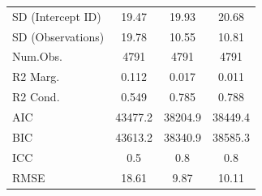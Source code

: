 \documentclass[]{report}
\begin{document}
\begin{table}
{\begin{tabular}[t]{lccc}
		SD (Intercept ID) & \num{19.47} & \num{19.93} & \num{20.68}\\
		SD (Observations) & \num{19.78} & \num{10.55} & \num{10.81}\\
		\midrule
		Num.Obs. & \num{4791} & \num{4791} & \num{4791}\\
		R2 Marg. & \num{0.112} & \num{0.017} & \num{0.011}\\
		R2 Cond. & \num{0.549} & \num{0.785} & \num{0.788}\\
		AIC & \num{43477.2} & \num{38204.9} & \num{38449.4}\\
		BIC & \num{43613.2} & \num{38340.9} & \num{38585.3}\\
		ICC & \num{0.5} & \num{0.8} & \num{0.8}\\
		RMSE & \num{18.61} & \num{9.87} & \num{10.11}\\
		\bottomrule
	\end{tabular}}
\end{table}
\end{document}

